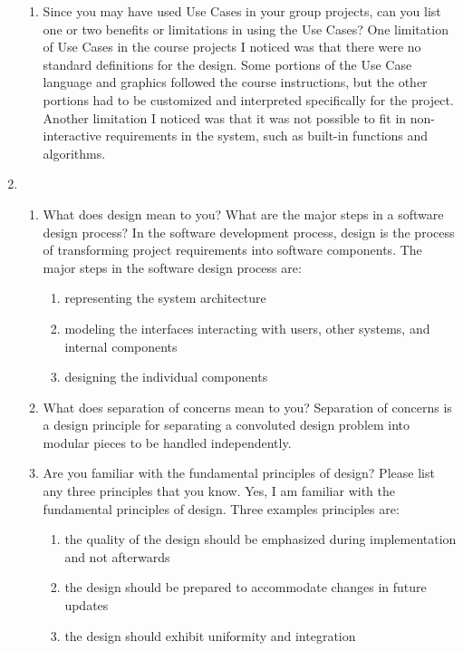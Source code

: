 \documentclass[12pt]{article}
\begin{document}
\begin{enumerate}
\begin{enumerate}[start=1,align=left]
      \item Since you may have used Use Cases in your group projects, can you list one or two benefits or limitations in using the Use Cases?
      One limitation of Use Cases in the course projects I noticed was that there were no standard definitions for the design. Some portions of the Use Case language and graphics followed the course instructions, but the other portions had to be customized and interpreted specifically for the project. Another limitation I noticed was that it was not possible to fit in non-interactive requirements in the system, such as built-in functions and algorithms.

    \end{enumerate}
    \item
    \begin{enumerate}[start=1,align=left]
      \item What does design mean to you? What are the major steps in a software design process?
      In the software development process, design is the process of transforming project requirements into software components. The major steps in the software design process are:
      \begin{enumerate}
        \item representing the system architecture
        \item modeling the interfaces interacting with users, other systems, and internal components
        \item designing the individual components
      \end{enumerate}

      \item What does separation of concerns mean to you?
      Separation of concerns is a design principle for separating a convoluted design problem into modular pieces to be handled independently.

      \item Are you familiar with the fundamental principles of design? Please list any three principles that you know.
      Yes, I am familiar with the fundamental principles of design. Three examples principles are:
      \begin{enumerate}
        \item the quality of the design should be emphasized during implementation and not afterwards
        \item the design should be prepared to accommodate changes in future updates
        \item the design should exhibit uniformity and integration
      \end{enumerate}


\end{enumerate}
\end{enumerate}
\end{document}
